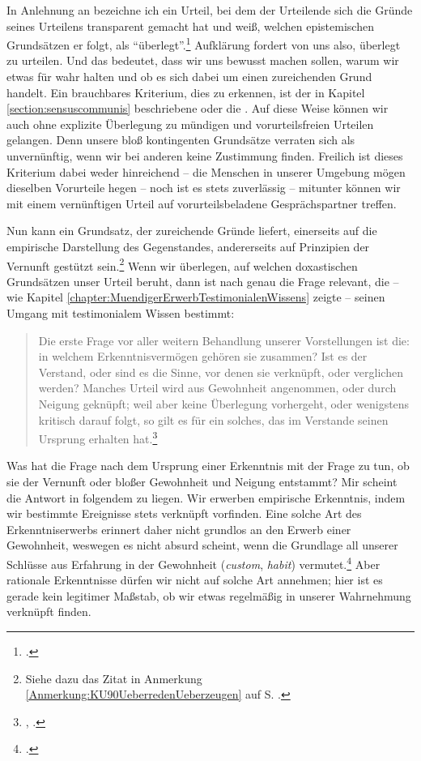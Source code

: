 In Anlehnung an  bezeichne ich ein Urteil, bei dem der
Urteilende sich die Gründe seines Urteilens transparent gemacht hat und weiß,
welchen epistemischen Grundsätzen er folgt, als
\enquote{überlegt}.\footnote{\cite[Vgl.][B
316\,f.,]{Kant:KritikderreinenVernunft2003} \cite[][III:
214.33--215.31]{Kant:GesammelteWerke1900ff.}.} Aufklärung fordert von uns also,
überlegt zu urteilen.
Und das bedeutet, dass wir uns bewusst machen sollen, warum wir etwas für
wahr halten und ob es sich dabei um einen zureichenden Grund handelt.
Ein brauchbares Kriterium, dies zu erkennen, ist der in Kapitel
\ref{section:sensuscommunis} beschriebene  oder die
. Auf diese Weise können wir auch ohne
explizite Überlegung zu mündigen und vorurteilsfreien Urteilen gelangen. Denn
unsere bloß kontingenten Grundsätze verraten sich als
unvernünftig, wenn wir bei anderen keine Zustimmung finden. Freilich ist dieses
Kriterium dabei weder hinreichend -- die Menschen in unserer Umgebung mögen
dieselben Vorurteile hegen -- noch ist es stets zuverlässig -- mitunter können
wir mit einem vernünftigen Urteil auf vorurteilsbeladene Gesprächspartner
treffen.


Nun kann ein Grundsatz, der zureichende Gründe liefert, einerseits auf
die empirische Darstellung des Gegenstandes, andererseits auf Prinzipien der
Vernunft gestützt sein.\footnote{Siehe dazu das Zitat in Anmerkung
\ref{Anmerkung:KU90UeberredenUeberzeugen} auf S. \pageref{Anmerkung:KU90UeberredenUeberzeugen}.}
Wenn wir überlegen, auf welchen doxastischen Grundsätzen unser Urteil beruht,
dann ist nach  genau die Frage relevant, die -- wie Kapitel
\ref{chapter:MuendigerErwerbTestimonialenWissens} zeigte -- seinen Umgang mit
testimonialem Wissen bestimmt:
\begin{quote}
Die erste Frage vor aller weitern Behandlung unserer Vorstellungen ist die: in
welchem Erkenntnisvermögen gehören sie zusammen? Ist es der Verstand, oder sind
es die Sinne, vor denen sie verknüpft, oder verglichen werden? Manches Urteil
wird aus Gewohnheit angenommen, oder durch Neigung geknüpft; weil aber keine
Überlegung vorhergeht, oder wenigstens kritisch darauf folgt, so gilt es für ein
solches, das im Verstande seinen Ursprung erhalten
hat.\footnote{\cite[][B 316]{Kant:KritikderreinenVernunft2003},
\cite[][III: 215.6--12]{Kant:GesammelteWerke1900ff.}.}
\end{quote}
Was hat die Frage nach dem Ursprung einer Erkenntnis mit der Frage zu tun, ob
sie der Vernunft oder bloßer Gewohnheit und Neigung entstammt? Mir scheint die
Antwort in folgendem zu liegen. Wir erwerben empirische Erkenntnis, indem wir
bestimmte Ereignisse stets verknüpft vorfinden. Eine solche Art des
Erkenntniserwerbs erinnert daher nicht grundlos an den Erwerb einer Gewohnheit,
weswegen es nicht absurd scheint, wenn
 die Grundlage
all unserer Schlüsse aus Erfahrung in der Gewohnheit (\emph{custom},
\emph{habit})
vermutet.\footnote{\cite[Vgl.][37]{Hume:AnEnquiryConcerningHumanUnderstanding1964}.}
Aber rationale Erkenntnisse dürfen wir nicht auf solche Art annehmen; hier ist
es gerade kein legitimer Maßstab, ob wir etwas regelmäßig in unserer Wahrnehmung
verknüpft finden.

